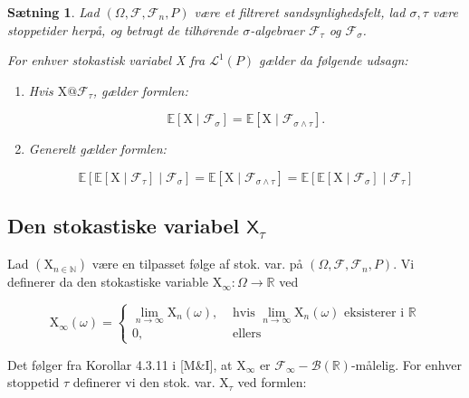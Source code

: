 \documentclass{article}
\newcommand{\1}{\mathbbm{1}}
\newcommand{\X}{\mathsf{X}}
\theoremstyle{boxed}
\newtheorem{proposition}[theorem]{Sætning}
\begin{document}
\begin{theorem-box}
    \begin{proposition}
        Lad $\left(\Omega, \mathcal{F}, \mathcal{F}_n, P\right)$ være et filtreret sandsynlighedsfelt, lad $\sigma, \tau$ være stoppetider herpå, og betragt de tilhørende $\sigma$-algebraer $\mathcal{F}_\tau$ og $\mathcal{F}_\sigma$.

For enhver stokastisk variabel X fra $\mathcal{L}^1(P)$ gælder da følgende udsagn:
\begin{enumerate}
    \item[\textnormal{(i)}]Hvis $\mathrm{X} @ \mathcal{F}_\tau$, gælder formlen:

    $$
    \mathbb{E}\left[\mathrm{X} \mid \mathcal{F}_\sigma\right]=\mathbb{E}\left[\mathrm{X} \mid \mathcal{F}_{\sigma \wedge \tau}\right] .
    $$
    \item[\textnormal{(ii)}] Generelt gælder formlen:

    $$
    \mathbb{E}\left[\mathbb{E}\left[\mathrm{X} \mid \mathcal{F}_\tau\right] \mid \mathcal{F}_\sigma\right]=\mathbb{E}\left[\mathrm{X} \mid \mathcal{F}_{\sigma \wedge \tau}\right]=\mathbb{E}\left[\mathbb{E}\left[\mathrm{X} \mid \mathcal{F}_\sigma\right] \mid \mathcal{F}_\tau\right]
    $$
\end{enumerate}
    \end{proposition}
\end{theorem-box}
\subsection*{Den stokastiske variabel $\X_\tau$}
Lad $\left(\mathrm{X}_{n \in \mathbb{N}}\right)$ være en tilpasset følge af stok. var. på $\left(\Omega, \mathcal{F}, \mathcal{F}_n, P\right)$.
Vi definerer da den stokastiske variable $\mathrm{X}_{\infty}: \Omega \rightarrow \mathbb{R}$ ved

$$
\mathrm{X}_{\infty}(\omega)= \begin{cases}\lim _{n \rightarrow \infty} \mathrm{X}_n(\omega), & \text { hvis } \lim _{n \rightarrow \infty} \mathrm{X}_n(\omega) \text { eksisterer i } \mathbb{R} \\ 0, & \text { ellers }\end{cases}
$$


Det følger fra Korollar 4.3.11 i [M\&I], at $\mathrm{X}_{\infty}$ er $\mathcal{F}_{\infty}-\mathcal{B}(\mathbb{R})$-målelig.
For enhver stoppetid $\tau$ definerer vi den stok. var. $\mathrm{X}_\tau$ ved formlen:
\end{document}
